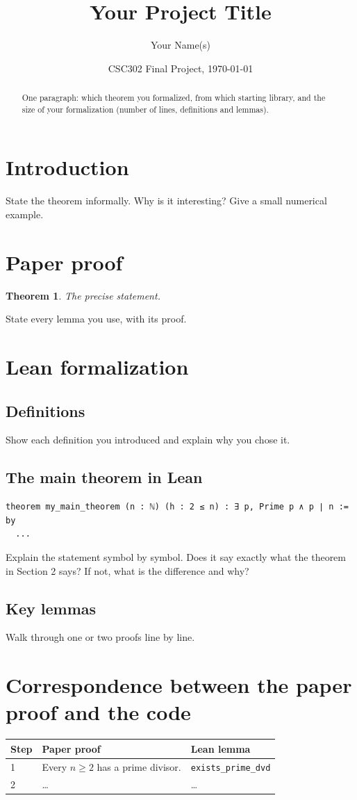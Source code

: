\documentclass[11pt]{article}
\title{Your Project Title}
\author{Your Name(s)}
\date{CSC302 Final Project, \today}
\newtheorem{theorem}{Theorem}
\theoremstyle{definition}
\begin{document}
\maketitle

\begin{abstract}
One paragraph: which theorem you formalized, from which starting library, and the size of
your formalization (number of lines, definitions and lemmas).
\end{abstract}

\section{Introduction}
State the theorem informally. Why is it interesting? Give a small numerical example.

\section{Paper proof}
\begin{theorem}
The precise statement.
\end{theorem}
State every lemma you use, with its proof.

\section{Lean formalization}
\subsection{Definitions}
Show each definition you introduced and explain why you chose it.

\subsection{The main theorem in Lean}
\begin{lstlisting}
theorem my_main_theorem (n : ℕ) (h : 2 ≤ n) : ∃ p, Prime p ∧ p ∣ n := by
  ...
\end{lstlisting}
Explain the statement symbol by symbol. Does it say exactly what the theorem in Section 2
says? If not, what is the difference and why?

\subsection{Key lemmas}
Walk through one or two proofs line by line.

\section{Correspondence between the paper proof and the code}
\begin{tabularx}{\textwidth}{@{}lXl@{}}
\toprule
Step & Paper proof & Lean lemma \\
\midrule
1 & Every $n \ge 2$ has a prime divisor. & \texttt{exists\_prime\_dvd} \\
2 & \dots & \dots \\
\bottomrule
\end{tabularx}
\end{document}
